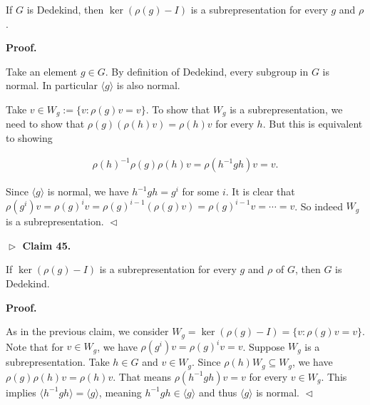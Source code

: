 If $G$ is Dedekind, then $\ker(\rho(g)-I)$ is a subrepresentation for every $g$ and $\rho$.\par






\par\medskip\noindent\textbf{
\textbf{Proof}.}\par




Take an element $g\in G$.
By definition of Dedekind, every subgroup in $G$ is normal.
In particular $\langle g\rangle$ is also normal.\par




Take $v\in W_{g}:=\{v:\rho(g)v=v\}$.
To show that $W_{g}$ is a subrepresentation, we need to show that $\rho(g)(\rho(h)v)=\rho(h)v$ for every $h$.
But this is equivalent to showing\par


\[\begin{gathered}
\rho(h)^{-1}\rho(g)\rho(h)v=\rho(h^{-1}gh)v=v.
\end{gathered}\]


Since $\langle g\rangle$ is normal, we have $h^{-1}gh=g^{i}$ for some $i$.
It is clear that $\rho(g^{i})v=\rho(g)^{i}v=\rho(g)^{i-1}(\rho(g)v)=\rho(g)^{i-1}v=\cdots=v$.
So indeed $W_{g}$ is a subrepresentation.
$\vartriangleleft$\par





\par\medskip\noindent\textbf{
$\vartriangleright$ Claim 45. }\par



If $\ker(\rho(g)-I)$ is a subrepresentation for every $g$ and $\rho$ of $G$, then $G$ is Dedekind.\par







\par\medskip\noindent\textbf{
\textbf{Proof}.}\par




As in the previous claim, we consider $W_{g}=\ker(\rho(g)-I)=\{v:\rho(g)v=v\}$.
Note that for $v\in W_{g}$, we have $\rho(g^{i})v=\rho(g)^{i}v=v$.
Suppose $W_{g}$ is a subrepresentation.
Take $h\in G$ and $v\in W_{g}$.
Since $\rho(h)W_{g}\subseteq W_{g}$, we have $\rho(g)\rho(h)v=\rho(h)v$.
That means $\rho(h^{-1}gh)v=v$ for every $v\in W_{g}$.
This implies $\langle h^{-1}gh\rangle=\langle g\rangle$, meaning $h^{-1}gh\in\langle g\rangle$ and thus $\langle g\rangle$ is normal.
$\vartriangleleft$\par






